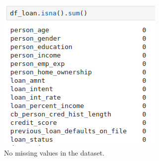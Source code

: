 \documentclass[12pt]{report}
\begin{document}
\begin{figure}[H]
    \centering
    \includegraphics[width=.7\linewidth]{pandas/Loan-NA.png}
    \caption{No missing values in the dataset.}
    \label{fig:Loan-NAs}
\end{figure}
\end{document}
